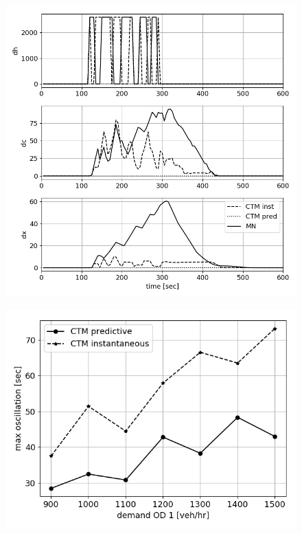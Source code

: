 \begin{figure}[h]
    \centering
    \includegraphics[width=\linewidth]{figs/dist2ctm.png}
    \caption{\XXX }
    \label{fig:dist2ctm}
\end{figure}

\begin{figure}[h]
    \centering
    \includegraphics[width=\linewidth]{figs/peaks.png}
    \caption{\XXX }
    \label{fig:peaks}
\end{figure}


